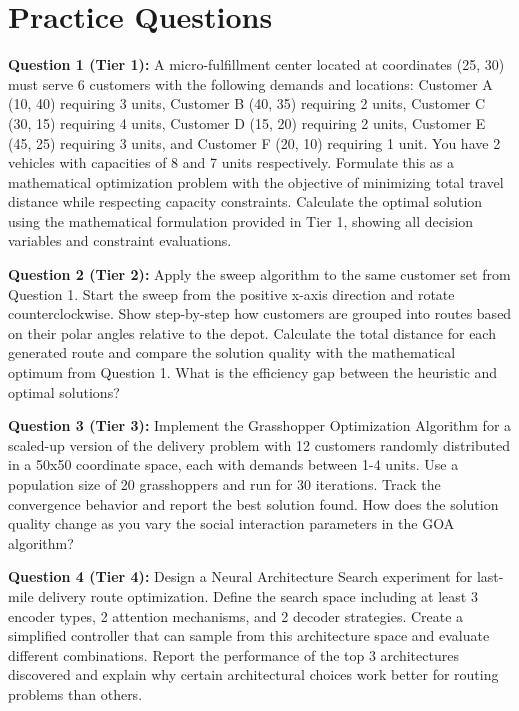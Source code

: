 \documentclass{article}
\begin{document}
\section{Practice Questions}

\textbf{Question 1 (Tier 1):} A micro-fulfillment center located at coordinates (25, 30) must serve 6 customers with the following demands and locations: Customer A (10, 40) requiring 3 units, Customer B (40, 35) requiring 2 units, Customer C (30, 15) requiring 4 units, Customer D (15, 20) requiring 2 units, Customer E (45, 25) requiring 3 units, and Customer F (20, 10) requiring 1 unit. You have 2 vehicles with capacities of 8 and 7 units respectively. Formulate this as a mathematical optimization problem with the objective of minimizing total travel distance while respecting capacity constraints. Calculate the optimal solution using the mathematical formulation provided in Tier 1, showing all decision variables and constraint evaluations.

\textbf{Question 2 (Tier 2):} Apply the sweep algorithm to the same customer set from Question 1. Start the sweep from the positive x-axis direction and rotate counterclockwise. Show step-by-step how customers are grouped into routes based on their polar angles relative to the depot. Calculate the total distance for each generated route and compare the solution quality with the mathematical optimum from Question 1. What is the efficiency gap between the heuristic and optimal solutions?

\textbf{Question 3 (Tier 3):} Implement the Grasshopper Optimization Algorithm for a scaled-up version of the delivery problem with 12 customers randomly distributed in a 50x50 coordinate space, each with demands between 1-4 units. Use a population size of 20 grasshoppers and run for 30 iterations. Track the convergence behavior and report the best solution found. How does the solution quality change as you vary the social interaction parameters in the GOA algorithm?

\textbf{Question 4 (Tier 4):} Design a Neural Architecture Search experiment for last-mile delivery route optimization. Define the search space including at least 3 encoder types, 2 attention mechanisms, and 2 decoder strategies. Create a simplified controller that can sample from this architecture space and evaluate different combinations. Report the performance of the top 3 architectures discovered and explain why certain architectural choices work better for routing problems than others.
\end{document}
